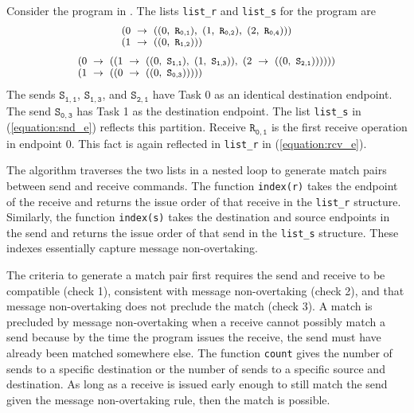 Consider the program in . The lists \texttt{list\_r} and \texttt{list\_s} for the program are
\begin{equation}
\footnotesize \begin{array}{l}
(0\ \rightarrow\ ((0,\ \mathtt{R_{0,1}}),\ (1,\ \mathtt{R_{0,2}}),\ (2,\ \mathtt{R_{0,4}})))\\
(1\ \rightarrow\ ((0,\ \mathtt{R_{1,2}})))\\
\end{array}
\label{equation:rcv_e}
\end{equation}
\begin{equation}
\footnotesize \begin{array}{l}
(0\ \rightarrow\ ((1\ \rightarrow\ ((0,\ \mathtt{S_{1,1}}),\ (1,\ \mathtt{S_{1,3}})),\ (2\ \rightarrow\ ((0,\ \mathtt{S_{2,1}}))))))\\
(1\ \rightarrow\ ((0\ \rightarrow\ ((0,\ \mathtt{S_{0,3}})))))\\
\end{array}
\label{equation:snd_e}
\end{equation}
The sends $\mathtt{S_{1,1}}$, $\mathtt{S_{1,3}}$, and
$\mathtt{S_{2,1}}$ have Task 0 as an identical destination
endpoint. The send $\mathtt{S_{0,3}}$ has Task 1 as the destination
endpoint. The list \texttt{list\_s} in (\ref{equation:snd_e}) reflects
this partition.  Receive $\mathtt{R_{0,1}}$ is the first receive
operation in endpoint 0. This fact is again reflected
in \texttt{list\_r} in (\ref{equation:rcv_e}).

The algorithm traverses the two lists in a nested loop to generate
match pairs between send and receive commands. The
function \texttt{index(r)} takes the endpoint of the receive and
returns the issue order of that receive in the \texttt{list\_r}
structure. Similarly, the function \texttt{index(s)} takes the
destination and source endpoints in the send and returns the issue
order of that send in the \texttt{list\_s} structure. These indexes
essentially capture message non-overtaking.

The criteria to generate a match pair first requires the send and
receive to be compatible (check 1), consistent with message
non-overtaking (check 2), and that message non-overtaking does not preclude the
match (check 3). A match is precluded by message non-overtaking when a
receive cannot possibly match a send because by the time the program
issues the receive, the send must have already been matched somewhere
else. The function \texttt{count} gives the number of sends to a
specific destination or the number of sends to a specific source and
destination.  As long as a receive is issued early enough to still
match the send given the message non-overtaking rule, then the match
is possible.

